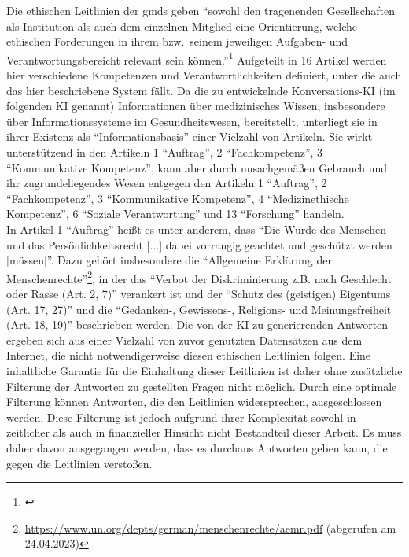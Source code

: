 Die ethischen Leitlinien der \ac{gmds} \citep{gmds_eth} geben \enquote{sowohl den tragenenden Gesellschaften als Institution als auch dem einzelnen Mitglied eine Orientierung,
welche ethischen Forderungen in ihrem bzw.\ seinem jeweiligen Aufgaben- und Verantwortungsbereicht relevant sein können.}\footnote{\label{ft:gmds}\citet{gmds_eth}}
Aufgeteilt in 16 Artikel werden hier verschiedene Kompetenzen und Verantwortlichkeiten definiert, unter die auch das hier beschriebene System fällt.
Da die zu entwickelnde Konversations-KI (im folgenden KI genannt) Informationen über medizinisches Wissen, insbesondere über Informationssysteme im Gesundheitswesen, bereitstellt,
unterliegt sie in ihrer Existenz als \enquote{Informationsbasis} einer Vielzahl von Artikeln.
Sie wirkt unterstützend in den Artikeln 1 \enquote{Auftrag}, 2 \enquote{Fachkompetenz}, 3 \enquote{Kommunikative Kompetenz}, 
kann aber durch unsachgemäßen Gebrauch und ihr zugrundeliegendes Wesen entgegen den Artikeln 1 \enquote{Auftrag}, 2 \enquote{Fachkompetenz}, 3 \enquote{Kommunikative Kompetenz},
4 \enquote{Medizinethische Kompetenz}, 6 \enquote{Soziale Verantwortung} und 13 \enquote{Forschung} handeln.\\

In Artikel 1 \enquote{Auftrag} heißt es unter anderem, dass 
\enquote{Die Würde des Menschen und das Persönlichkeitsrecht [$\dots$] dabei vorrangig geachtet und geschützt werden [müssen]}.
Dazu gehört insbesondere die \enquote{Allgemeine Erklärung der Menschenrechte}\footnote{\url{https://www.un.org/depts/german/menschenrechte/aemr.pdf} (abgerufen am 24.04.2023) },
in der das \enquote{Verbot der Diskriminierung z.B. nach Geschlecht oder Rasse (Art. 2, 7)} verankert ist und 
der \enquote{Schutz des (geistigen) Eigentums (Art. 17, 27)} und die \enquote{Gedanken-, Gewissens-, Religions- und Meinungsfreiheit (Art. 18, 19)} beschrieben werden.
Die von der KI zu generierenden Antworten ergeben sich aus einer Vielzahl von zuvor genutzten Datensätzen aus dem Internet, die nicht notwendigerweise diesen ethischen Leitlinien folgen.
Eine inhaltliche Garantie für die Einhaltung dieser Leitlinien ist daher ohne zusätzliche Filterung der Antworten zu gestellten Fragen nicht möglich. 
Durch eine optimale Filterung können Antworten, die den Leitlinien widersprechen, ausgeschlossen werden. 
Diese Filterung ist jedoch aufgrund ihrer Komplexität sowohl in zeitlicher als auch in finanzieller Hinsicht nicht Bestandteil dieser Arbeit.
Es muss daher davon ausgegangen werden, dass es durchaus Antworten geben kann, die gegen die Leitlinien verstoßen.\\

